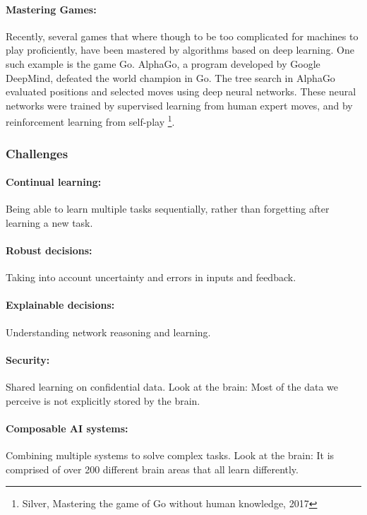 \documentclass[main]{subfiles}
\begin{document}
\paragraph{Mastering Games:} 
Recently, several games that where though to be too complicated for machines to play proficiently, have been mastered by algorithms based on deep learning. One such example is the game Go. AlphaGo, a program developed by Google DeepMind, defeated the world champion in Go. The tree search in AlphaGo evaluated positions and selected moves using deep neural networks. These neural networks were trained by supervised learning from human expert moves, and by reinforcement learning from self-play \footnote{Silver, Mastering the game of Go without human knowledge, 2017}.

\subsubsection{Challenges}

\paragraph{Continual learning:}
Being able to learn multiple tasks sequentially, rather than forgetting after learning a new task.
\paragraph{Robust decisions:}
Taking into account uncertainty and errors in inputs and feedback.
\paragraph{Explainable decisions:}
Understanding network reasoning and learning.
\paragraph{Security:}
Shared learning on confidential data. Look at the brain: Most of the data we perceive is not explicitly stored by the brain. 
\paragraph{Composable AI systems:}
Combining multiple systems to solve complex tasks. Look at the brain: It is comprised of over 200 different brain areas that all learn differently. 
\end{document}
